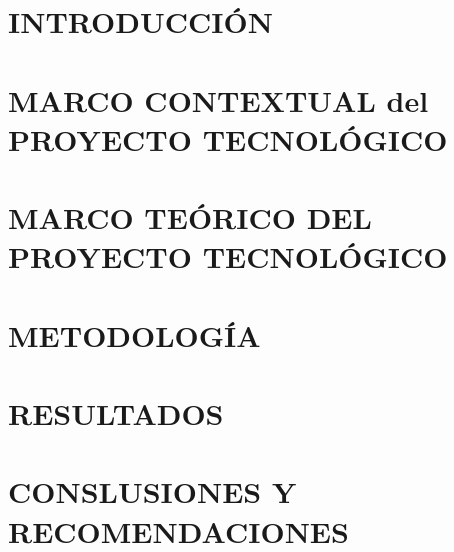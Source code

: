 \documentclass[12pt,a4paper]{report}
\begin{document}


\tableofcontents
\listoftables
\listoffigures

\clearpage
{}
\setcounter{page}{1}


\chapter*{INTRODUCCIÓN}


\chapter{MARCO CONTEXTUAL del PROYECTO  TECNOLÓGICO}
\clearpage


\chapter{MARCO TEÓRICO DEL PROYECTO TECNOLÓGICO}
\clearpage


\chapter{METODOLOGÍA}
\clearpage


\chapter{RESULTADOS}
\clearpage


\chapter{CONSLUSIONES Y RECOMENDACIONES}
\clearpage

\label{cap:conclusiones}


\printbibliography[title={REFERENCIAS BIBLIOGRÁFICAS}]

\appendix

\end{document}
